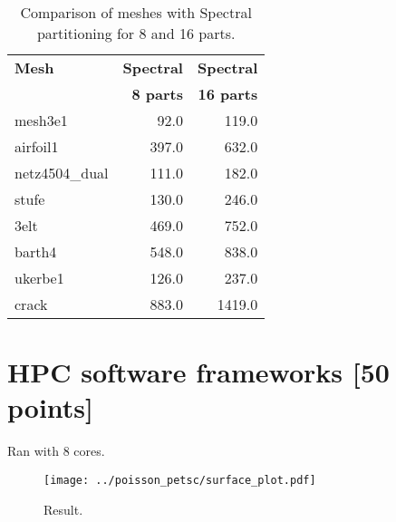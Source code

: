 \documentclass[unicode,11pt,a4paper,oneside,numbers=endperiod,openany]{scrartcl}
\begin{document}
\begin{table}[h!]
    \centering
    \begin{tabular}{|l|r|r|}
    \hline
    \textbf{Mesh} & \textbf{Spectral} & \textbf{Spectral} \\ 
    \textbf{} & \textbf{8 parts} & \textbf{16 parts} \\ \hline
    mesh3e1 & 92.0 & 119.0 \\ \hline
    airfoil1 & 397.0 & 632.0 \\ \hline
    netz4504\_dual & 111.0 & 182.0 \\ \hline
    stufe & 130.0 & 246.0 \\ \hline
    3elt & 469.0 & 752.0 \\ \hline
    barth4 & 548.0 & 838.0 \\ \hline
    ukerbe1 & 126.0 & 237.0 \\ \hline
    crack & 883.0 & 1419.0 \\ \hline
    \end{tabular}
    \caption{Comparison of meshes with Spectral partitioning for 8 and 16 parts.}
\end{table}
        
    

\section{HPC software frameworks [50 points]}
Ran with 8 cores.

\begin{figure}[h!]
    \centering
    \texttt{[image: ../poisson\_petsc/surface\_plot.pdf]}
    \caption{Result.}
    \label{fig:data}
\end{figure}
\end{document}

